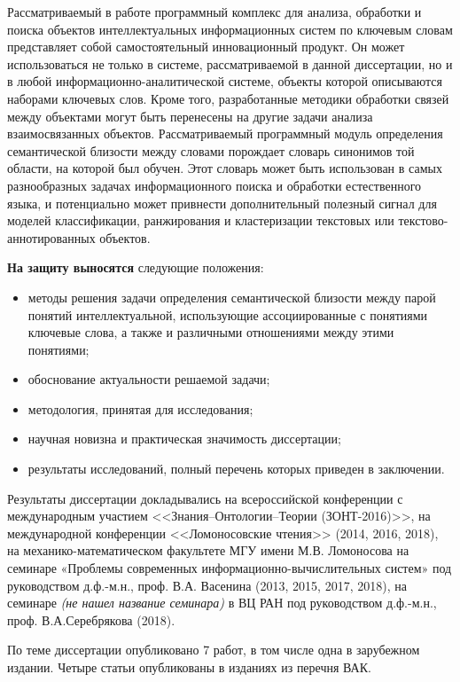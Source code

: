 {\influence} Рассматриваемый в работе программный комплекс для анализа, обработки и поиска объектов интеллектуальных информационных систем по ключевым словам представляет собой самостоятельный инновационный продукт. Он может использоваться не только в системе, рассматриваемой в данной диссертации, но и в любой информационно-аналитической системе, объекты которой описываются наборами ключевых слов. Кроме того, разработанные методики обработки связей между объектами могут быть перенесены на другие задачи анализа взаимосвязанных объектов. Рассматриваемый программный модуль определения семантической близости между словами  порождает словарь синонимов той области, на которой был обучен. Этот словарь может быть использован в самых разнообразных задачах информационного поиска и обработки естественного языка, и потенциально может привнести дополнительный полезный сигнал для моделей классификации, ранжирования и кластеризации текстовых или текстово-аннотированных объектов.


\textbf{На защиту выносятся} следующие положения:
\begin{itemize}
    \item методы решения задачи определения семантической близости между парой понятий интеллектуальной, использующие ассоциированные с понятиями ключевые слова, а также  и различными отношениями между этими понятиями;
    \item обоснование актуальности решаемой задачи;
    \item методология, принятая для исследования;
    \item научная новизна и практическая значимость диссертации;
    \item результаты исследований, полный перечень которых приведен в заключении.
\end{itemize}

{\probation} Результаты диссертации докладывались на всероссийской конференции с международным участием <<Знания–Онтологии–Теории (ЗОНТ-2016)>>, на международной конференции <<Ломоносовские чтения>> (2014, 2016, 2018),  на механико-математическом факультете МГУ имени М.В. Ломоносова на семинаре «Проблемы современных информационно-вычислительных систем» под руководством д.ф.-м.н., проф. В.А. Васенина (2013, 2015, 2017, 2018), на семинаре \emph{(не нашел название семинара)} в ВЦ РАН под руководством д.ф.-м.н., проф. В.А.Серебрякова (2018).

По теме диссертации опубликовано 7 работ, в том числе одна в зарубежном издании. Четыре статьи \cite{lunev_paper_1,lunev_paper_2,lunev_paper_3,lunev_paper_4} опубликованы в изданиях из перечня ВАК.

